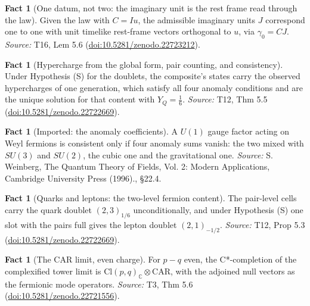 \documentclass[11pt]{article}
\theoremstyle{definition}
\newtheorem{fact}[theorem]{Fact}
\theoremstyle{plain}
\providecommand{\C}{}\renewcommand{\C}{\mathbb{C}}
\providecommand{\CAR}{}\renewcommand{\CAR}{\mathrm{CAR}}
\providecommand{\Cl}{}\renewcommand{\Cl}{\mathrm{Cl}}
\begin{document}
\begin{fact}[One datum, not two: the imaginary unit is the rest frame read through the law]\label{c:one-relation.one-datum-not-two-imaginary-unit}
Given the law with $C = Iu$, the admissible imaginary units $J$ correspond one to one with unit timelike rest-frame vectors orthogonal to $u$, via $\gamma_{0} = CJ$.
\emph{Source:} T16, Lem 5.6 (\href{https://doi.org/10.5281/zenodo.22723212}{doi:10.5281/zenodo.22723212}).
\end{fact}

\begin{fact}[Hypercharge from the global form, pair counting, and consistency]\label{c:standard-model.hypercharge-global-form-pair-counting-consistency}
Under Hypothesis (S) for the doublets, the composite's states carry the observed hypercharges of one generation, which satisfy all four anomaly conditions and are the unique solution for that content with $Y_{Q} = \tfrac16$.
\emph{Source:} T12, Thm 5.5 (\href{https://doi.org/10.5281/zenodo.22722669}{doi:10.5281/zenodo.22722669}).
\end{fact}

\begin{fact}[Imported: the anomaly coefficients]\label{c:standard-model.imported-anomaly-coefficients}
A $U(1)$ gauge factor acting on Weyl fermions is consistent only if four anomaly sums vanish: the two mixed with $SU(3)$ and $SU(2)$, the cubic one and the gravitational one.
\emph{Source:} S. Weinberg, The Quantum Theory of Fields, Vol. 2: Modern Applications, Cambridge University Press (1996)., \S 22.4.
\end{fact}

\begin{fact}[Quarks and leptons: the two-level fermion content]\label{c:standard-model.quarks-leptons-two-level-fermion-content}
The pair-level cells carry the quark doublet $(2,3)_{1/6}$ unconditionally, and under Hypothesis (S) one slot with the pairs full gives the lepton doublet $(2,1)_{-1/2}$.
\emph{Source:} T12, Prop 5.3 (\href{https://doi.org/10.5281/zenodo.22722669}{doi:10.5281/zenodo.22722669}).
\end{fact}

\begin{fact}[The CAR limit, even charge]\label{c:tower.car-limit-even-charge}
For $p - q$ even, the C*-completion of the complexified tower limit is $\Cl(p,q)_\C \otimes \CAR$, with the adjoined null vectors as the fermionic mode operators.
\emph{Source:} T3, Thm 5.6 (\href{https://doi.org/10.5281/zenodo.22721556}{doi:10.5281/zenodo.22721556}).
\end{fact}
\end{document}
